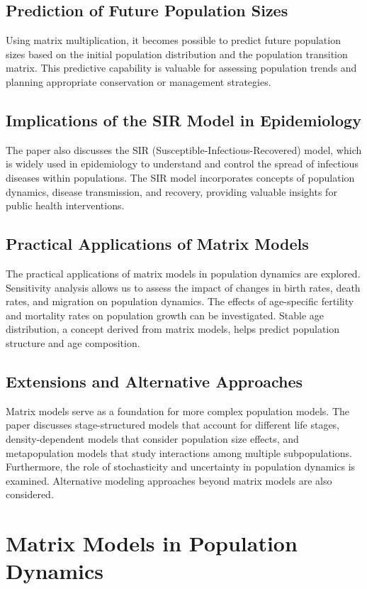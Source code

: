 \documentclass[12pt]{article}
\begin{document}
\subsection{Prediction of Future Population Sizes}
Using matrix multiplication, it becomes possible to predict future population sizes based on the initial population distribution and the population transition matrix. This predictive capability is valuable for assessing population trends and planning appropriate conservation or management strategies.

\subsection{Implications of the SIR Model in Epidemiology}
The paper also discusses the SIR (Susceptible-Infectious-Recovered) model, which is widely used in epidemiology to understand and control the spread of infectious diseases within populations. The SIR model incorporates concepts of population dynamics, disease transmission, and recovery, providing valuable insights for public health interventions.

\subsection{Practical Applications of Matrix Models}
The practical applications of matrix models in population dynamics are explored. Sensitivity analysis allows us to assess the impact of changes in birth rates, death rates, and migration on population dynamics. The effects of age-specific fertility and mortality rates on population growth can be investigated. Stable age distribution, a concept derived from matrix models, helps predict population structure and age composition.

\subsection{Extensions and Alternative Approaches}
Matrix models serve as a foundation for more complex population models. The paper discusses stage-structured models that account for different life stages, density-dependent models that consider population size effects, and metapopulation models that study interactions among multiple subpopulations. Furthermore, the role of stochasticity and uncertainty in population dynamics is examined. Alternative modeling approaches beyond matrix models are also considered.

\section{Matrix Models in Population Dynamics}
\end{document}

